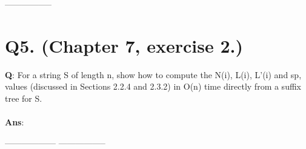 \documentclass[a4paper,11pt]{article}
\begin{document}
\begin{center}
-----------------\\
\end{center}

\section*{Q5. (Chapter 7, exercise 2.)}
\textbf{Q}: For a string S of length n, show how to compute the N(i), L(i), L'(i) and sp, values (discussed in Sections 2.2.4 and 2.3.2) in O(n) time directly from a suffix tree for S.
\\
\\
 \textbf{Ans}:%

\begin{center}

 ------------------ -----------------
\end{center}
\end{document}
